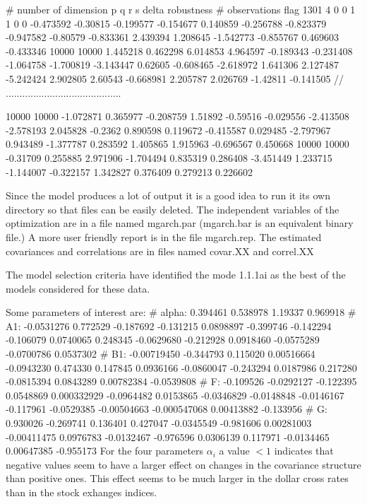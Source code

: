 {\obeylines\obeyspaces

\# number of     dimension    p q r s  delta  robustness
\# observations                        flag
  1301            4          0 0 1 1   0        0
-0.473592      -0.30815      -0.199577      -0.154677
0.140859      -0.256788      -0.823379      -0.947582
-0.80579      -0.833361      2.439394      1.208645
-1.542773      -0.855767      0.469603      -0.433346
10000          10000          1.445218      0.462298
6.014853      4.964597      -0.189343      -0.231408
-1.064758      -1.700819      -3.143447      0.62605
-0.608465      -2.618972      1.641306      2.127487
-5.242424      2.902805      2.60543        -0.668981
2.205787      2.026769      -1.42811      -0.141505
 // ..........................................

10000           10000        -1.072871      0.365977
-0.208759      1.51892      -0.59516        -0.029556
-2.413508      -2.578193      2.045828      -0.2362
0.890598      0.119672      -0.415587      0.029485
-2.797967      0.943489      -1.377787      0.283592
1.405865      1.915963      -0.696567      0.450668
10000          10000        -0.31709      0.255885
2.971906      -1.704494      0.835319      0.286408
-3.451449      1.233715      -1.144007      -0.322157
1.342827      0.376409      0.279213      0.226602
}


Since the model produces a lot of output it is a good idea to run it its own directory
so that files can be easily deleted. The independent variables of the
optimization are in a file named mgarch.par (mgarch.bar is an equivalent binary file.)
A more user friendly report is in the file mgarch.rep.
The estimated covariances and correlations are in files named covar.XX and correl.XX

The model selection criteria have identified the mode 1.1.1ai
as the best of the models considered for these data.

Some parameters of interest are:
{\obeylines\obeyspaces
\# alpha:
 0.394461 0.538978 1.19337 0.969918
\# A1:
 -0.0531276 0.772529 -0.187692 -0.131215
 0.0898897 -0.399746 -0.142294 -0.106079
 0.0740065 0.248345 -0.0629680 -0.212928
 0.0918460 -0.0575289 -0.0700786 0.0537302
\# B1:
 -0.00719450 -0.344793 0.115020 0.00516664
 -0.0943230 0.474330 0.147845 0.0936166
 -0.0860047 -0.243294 0.0187986 0.217280
 -0.0815394 0.0843289 0.00782384 -0.0539808
\# F:
 -0.109526 -0.0292127 -0.122395 0.0548869
 0.000332929 -0.0964482 0.0153865 -0.0346829
 -0.0148848 -0.0146167 -0.117961 -0.0529385
 -0.00504663 -0.000547068 0.00413882 -0.133956
\# G:
 0.930026 -0.269741 0.136401 0.427047
 -0.0345549 -0.981606 0.00281003 -0.00411475
 0.0976783 -0.0132467 -0.976596 0.0306139
 0.117971 -0.0134465 0.00647385 -0.955173
}
For the four parameters $\alpha_i$ a value $<1$ indicates
that negative values seem to have a larger effect on changes
in the covariance structure than positive ones. This effect seems
to be much larger in the dollar cross rates than in the
stock exhanges indices.


